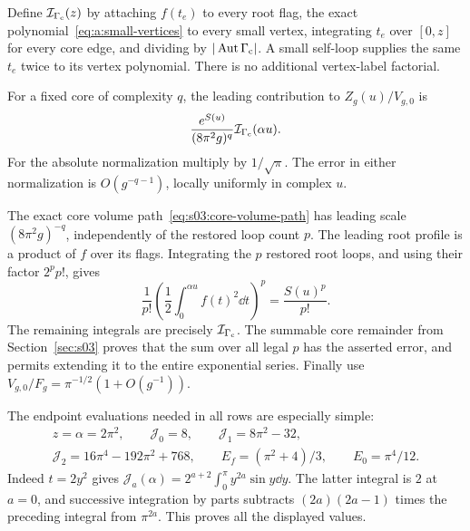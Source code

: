 Define $\mathcal I_{\Gamma_{\rm c}}(z)$ by attaching $f(t_e)$ to
every root flag, the exact polynomial~\eqref{eq:a:small-vertices}
to every small vertex, integrating $t_e$ over $[0,z]$ for every core
edge, and dividing by $|\operatorname{Aut}\Gamma_{\rm c}|$. A small
self-loop supplies the same $t_e$ twice to its vertex polynomial.
There is no additional vertex-label factorial.

\begin{lmm}\label{lmm:a:core-integration}
For a fixed core of complexity $q$, the leading contribution to
$Z_g(u)/V_{g,0}$ is
\begin{equation}\label{eq:a:leading-core}
 \frac{e^{S(u)}}{(8\pi^2g)^q}
           \mathcal I_{\Gamma_{\rm c}}(\alpha u).
\end{equation}
For the absolute normalization multiply by $1/\sqrt\pi$. The error
in either normalization is $O(g^{-q-1})$, locally uniformly in complex $u$.
\end{lmm}
\begin{prf}
The exact core volume path~\eqref{eq:s03:core-volume-path} has
leading scale $(8\pi^2g)^{-q}$, independently of the restored loop
count $p$. The leading root profile is a product of $f$ over its
flags. Integrating the $p$ restored root loops, and using their factor
$2^pp!$, gives
\[
 \frac1{p!}\left(\frac12\int_0^{\alpha u}f(t)^2\dd t\right)^p
 =\frac{S(u)^p}{p!}.
\]
The remaining integrals are precisely $\mathcal I_{\Gamma_{\rm c}}$.
The summable core remainder from Section~\ref{sec:s03} proves that
the sum over all legal $p$ has the asserted error, and permits extending
it to the entire exponential series. Finally use
$V_{g,0}/F_g=\pi^{-1/2}(1+O(g^{-1}))$.
\end{prf}

The endpoint evaluations needed in all rows are especially simple:
\begin{equation}\label{eq:a:endpoint-moments}
\begin{gathered}
 z=\alpha=2\pi^2,\qquad \mathcal J_0=8,\qquad
 \mathcal J_1=8\pi^2-32,\\
 \mathcal J_2=16\pi^4-192\pi^2+768,\qquad
 E_f=(\pi^2+4)/3,\qquad E_0=\pi^4/12.
\end{gathered}
\end{equation}
Indeed $t=2y^2$ gives
$\mathcal J_a(\alpha)=2^{a+2}\int_0^\pi y^{2a}\sin y\dd y$.
The latter integral is $2$ at $a=0$, and successive integration by
parts subtracts $(2a)(2a-1)$ times the preceding integral from
$\pi^{2a}$. This proves all the displayed values.

